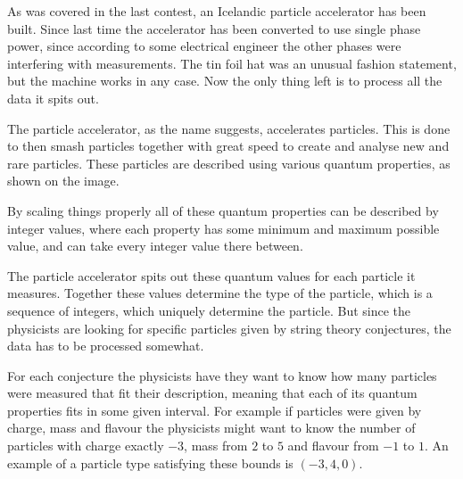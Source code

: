 
As was covered in the last contest, an Icelandic particle
accelerator has been built. Since last time the accelerator
has been converted to use single phase power, since according
to some electrical engineer the other phases were
interfering with measurements. The tin foil hat was an unusual
fashion statement, but the machine works in any case. Now the
only thing left is to process all the data it spits out.

The particle accelerator, as the name suggests, accelerates
particles. This is done to then smash particles together with
great speed to create and analyse new and rare particles.
These particles are described using various quantum
properties, as shown on the image.

By scaling things properly all of these quantum properties
can be described by integer values, where each property has
some minimum and maximum possible value, and can take every
integer value there between.

The particle accelerator spits out these quantum values
for each particle it measures. Together these values
determine the type of the particle, which is a sequence
of integers, which uniquely determine the particle.
But since the physicists are
looking for specific particles given by string theory
conjectures, the data has to be processed somewhat.

For each conjecture the physicists have they want to know
how many particles were measured that fit their description,
meaning that each of its quantum properties fits in some
given interval. For example if particles were given by
charge, mass and flavour the physicists might want to know
the number of particles with charge exactly $-3$, mass from
$2$ to $5$ and flavour from $-1$ to $1$. An example of a
particle type satisfying these bounds is $(-3, 4, 0)$.

